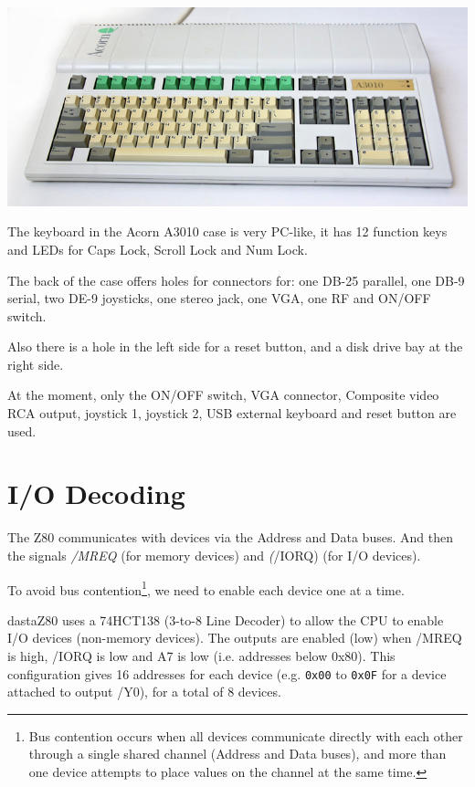 \documentclass[a4paper,11pt]{article}
\begin{document}
    \begin{center}
        \includegraphics{images/acorn3010top.png}
    \end{center}

    The keyboard in the Acorn A3010 case is very PC-like, it has 12 function
    keys and LEDs for Caps Lock, Scroll Lock and Num Lock.

    The back of the case offers holes for connectors for: one DB-25 parallel, 
    one DB-9 serial, two DE-9 joysticks, one stereo jack, one VGA, one RF and
    ON/OFF switch.

    Also there is a hole in the left side for a reset button, and a disk drive
    bay at the right side.

    At the moment, only the ON/OFF switch, VGA connector, Composite video RCA
    output, joystick 1, joystick 2, USB external keyboard and reset button are
    used.

    \pagebreak
    \section{I/O Decoding}

    The Z80 communicates with devices via the Address and Data buses. And then
    the signals \textit{/MREQ} (for memory devices) and \textit(/IORQ) (for I/O
    devices).

    To avoid bus contention\footnote{Bus contention occurs when all devices
    communicate directly with each other through a single shared channel
    (Address and Data buses), and more than one device attempts to place values
    on the channel at the same time.}, we need to enable each device one at a
    time.

    dastaZ80 uses a 74HCT138 (3-to-8 Line Decoder) to allow the CPU to enable
    I/O devices (non-memory devices). The outputs are enabled (low) when /MREQ
    is high, /IORQ is low and A7 is low (i.e. addresses below 0x80). This
    configuration gives 16 addresses for each device (e.g. \texttt{0x00} to
    \texttt{0x0F} for a device attached to output /Y0), for a total of 8 devices.
\end{document}
